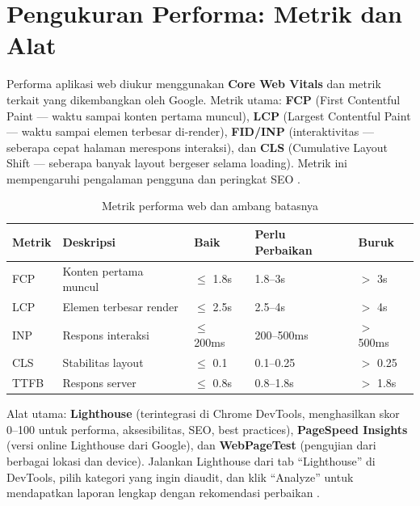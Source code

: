 ﻿\section{Pengukuran Performa: Metrik dan Alat}

Performa aplikasi web diukur menggunakan \textbf{Core Web Vitals} dan metrik terkait yang dikembangkan oleh Google. Metrik utama: \textbf{FCP} (First Contentful Paint --- waktu sampai konten pertama muncul), \textbf{LCP} (Largest Contentful Paint --- waktu sampai elemen terbesar di-render), \textbf{FID/INP} (interaktivitas --- seberapa cepat halaman merespons interaksi), dan \textbf{CLS} (Cumulative Layout Shift --- seberapa banyak layout bergeser selama loading). Metrik ini mempengaruhi pengalaman pengguna dan peringkat SEO \cite{mdnToolsTesting}.

\begin{table}[H]
\centering
\begin{tabular}{|P{1.8cm}|P{4cm}|P{2cm}|P{2cm}|P{2cm}|}
\hline
\textbf{Metrik} & \textbf{Deskripsi} & \textbf{Baik} & \textbf{Perlu Perbaikan} & \textbf{Buruk} \\
\hline
FCP & Konten pertama muncul & $\leq$ 1.8s & 1.8--3s & $>$ 3s \\
\hline
LCP & Elemen terbesar render & $\leq$ 2.5s & 2.5--4s & $>$ 4s \\
\hline
INP & Respons interaksi & $\leq$ 200ms & 200--500ms & $>$ 500ms \\
\hline
CLS & Stabilitas layout & $\leq$ 0.1 & 0.1--0.25 & $>$ 0.25 \\
\hline
TTFB & Respons server & $\leq$ 0.8s & 0.8--1.8s & $>$ 1.8s \\
\hline
\end{tabular}
\caption{Metrik performa web dan ambang batasnya}
\end{table}

Alat utama: \textbf{Lighthouse} (terintegrasi di Chrome DevTools, menghasilkan skor 0--100 untuk performa, aksesibilitas, SEO, best practices), \textbf{PageSpeed Insights} (versi online Lighthouse dari Google), dan \textbf{WebPageTest} (pengujian dari berbagai lokasi dan device). Jalankan Lighthouse dari tab ``Lighthouse'' di DevTools, pilih kategori yang ingin diaudit, dan klik ``Analyze'' untuk mendapatkan laporan lengkap dengan rekomendasi perbaikan \cite{mdnToolsTesting}.

